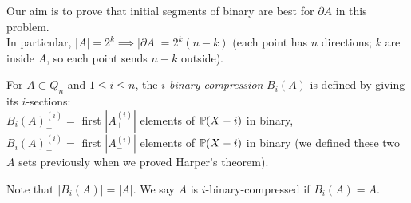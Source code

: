 \documentclass[a4paper]{article}
\begin{document}
Our aim is to prove that initial segments of binary are best for $\partial A$ in this problem.\\
In particular, $|A|=2^k \implies |\partial A| = 2^k (n-k)$ (each point has $n$ directions; $k$ are inside $A$, so each point sends $n-k$ outside).

For $A \subset Q_n$ and $1 \leq i \leq n$, the \emph{$i$-binary compression} $B_i(A)$ is defined by giving its $i$-sections:\\
$B_i(A)^{(i)}_+ = $ first $|A^{(i)}_+|$ elements of $\P(X-i)$ in binary,\\
$B_i(A)^{(i)}_- = $ first $|A^{(i)}_-|$ elements of $\P(X-i)$ in binary (we defined these two $A$ sets previously when we proved Harper's theorem).

Note that $|B_i(A)| = |A|$. We say $A$ is $i$-binary-compressed if $B_i(A) = A$.
\end{document}
